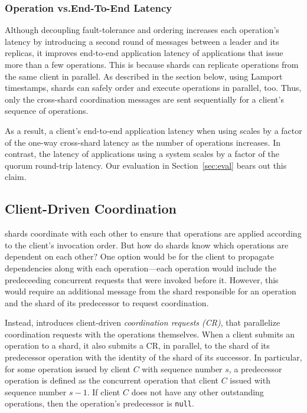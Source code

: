 
\subsubsection{Operation vs.\@ End-To-End Latency}

Although decoupling fault-tolerance and ordering increases each operation's latency by introducing a
second round of messages between a leader and its replicas, it improves end-to-end application
latency of applications that issue more than a few operations. This is because shards can replicate
operations from the same client in parallel. As described in the section below, using Lamport timestamps,
shards can safely order and execute operations in parallel, too. Thus, only the cross-shard coordination
messages are sent sequentially for a client's sequence of operations.

As a result, a client's end-to-end application latency when using \sys{} scales by a factor
of the one-way cross-shard latency as the number of operations increases. In contrast,
the latency of applications using a \singledispatch{} system scales by a factor of the
quorum round-trip latency. Our evaluation in Section~\ref{sec:eval} bears out this claim.

\subsection{Client-Driven Coordination}

\sys{} shards coordinate with each other to ensure that operations are applied
according to the client's invocation order. But how do shards know which
operations are dependent on each other? One option would be for the client to
propagate dependencies along with each operation---each operation would include
the predeceeding concurrent requests that were invoked before it. However, this
would require an additional message from the shard responsible for an operation
and the shard of its predecessor to request coordination.

Instead, \sys{} introduces client-driven \textit{coordination requests (CR)},
that parallelize coordination requests with the operations themselves.  When a
client submits an operation to a shard, it also submits a CR, in parallel, to
the shard of its predecessor operation with the identity of the shard of its
successor.  In particular, for some operation issued by client $C$ with sequence
number $s$, a predecessor operation is defined as the concurrent operation that
client $C$ issued with sequence number $s-1$. If client $C$ does not have any
other outstanding operations, then the operation's predecessor is \texttt{null}.

